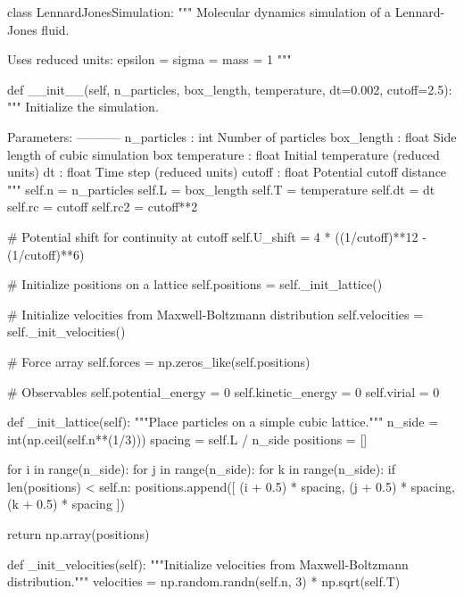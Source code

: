 \documentclass[11pt,a4paper]{article}
\begin{document}
\begin{pycode}
class LennardJonesSimulation:
    """
    Molecular dynamics simulation of a Lennard-Jones fluid.

    Uses reduced units: epsilon = sigma = mass = 1
    """

    def __init__(self, n_particles, box_length, temperature, dt=0.002, cutoff=2.5):
        """
        Initialize the simulation.

        Parameters:
        -----------
        n_particles : int
            Number of particles
        box_length : float
            Side length of cubic simulation box
        temperature : float
            Initial temperature (reduced units)
        dt : float
            Time step (reduced units)
        cutoff : float
            Potential cutoff distance
        """
        self.n = n_particles
        self.L = box_length
        self.T = temperature
        self.dt = dt
        self.rc = cutoff
        self.rc2 = cutoff**2

        # Potential shift for continuity at cutoff
        self.U_shift = 4 * ((1/cutoff)**12 - (1/cutoff)**6)

        # Initialize positions on a lattice
        self.positions = self._init_lattice()

        # Initialize velocities from Maxwell-Boltzmann distribution
        self.velocities = self._init_velocities()

        # Force array
        self.forces = np.zeros_like(self.positions)

        # Observables
        self.potential_energy = 0
        self.kinetic_energy = 0
        self.virial = 0

    def _init_lattice(self):
        """Place particles on a simple cubic lattice."""
        n_side = int(np.ceil(self.n**(1/3)))
        spacing = self.L / n_side
        positions = []

        for i in range(n_side):
            for j in range(n_side):
                for k in range(n_side):
                    if len(positions) < self.n:
                        positions.append([
                            (i + 0.5) * spacing,
                            (j + 0.5) * spacing,
                            (k + 0.5) * spacing
                        ])

        return np.array(positions)

    def _init_velocities(self):
        """Initialize velocities from Maxwell-Boltzmann distribution."""
        velocities = np.random.randn(self.n, 3) * np.sqrt(self.T)


\end{pycode}
\end{document}
